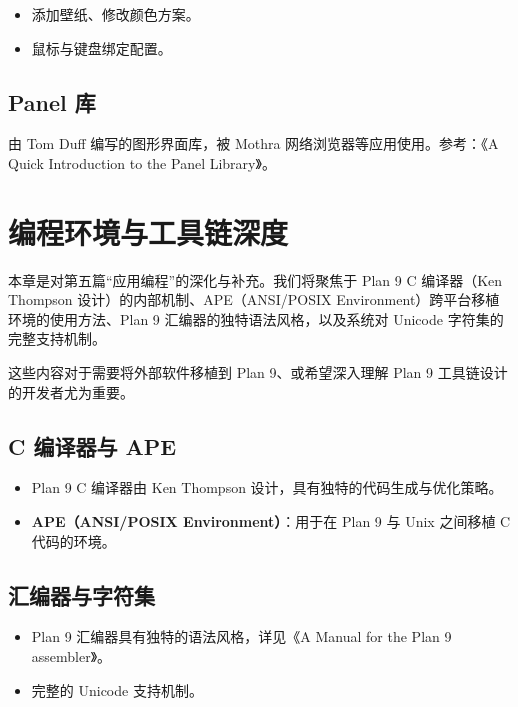 \documentclass[12pt,UTF8]{ctexbook}
\begin{document}
\begin{itemize}
\item 添加壁纸、修改颜色方案。
\item 鼠标与键盘绑定配置。
\end{itemize}

\section{Panel 库}

由 Tom Duff 编写的图形界面库，被 Mothra 网络浏览器等应用使用。参考：《A Quick Introduction to the Panel Library》。

\chapter{编程环境与工具链深度}
	
本章是对第五篇“应用编程”的深化与补充。我们将聚焦于 Plan 9 C 编译器（Ken Thompson 设计）的内部机制、APE（ANSI/POSIX Environment）跨平台移植环境的使用方法、Plan 9 汇编器的独特语法风格，以及系统对 Unicode 字符集的完整支持机制。

这些内容对于需要将外部软件移植到 Plan 9、或希望深入理解 Plan 9 工具链设计的开发者尤为重要。
	
\section{C 编译器与 APE}

\begin{itemize}
\item Plan 9 C 编译器由 Ken Thompson 设计，具有独特的代码生成与优化策略。
\item \textbf{APE（ANSI/POSIX Environment）}：用于在 Plan 9 与 Unix 之间移植 C 代码的环境。
\end{itemize}

\section{汇编器与字符集}
\begin{itemize}
\item Plan 9 汇编器具有独特的语法风格，详见《A Manual for the Plan 9 assembler》。
\item 完整的 Unicode 支持机制。
\end{itemize}
	
\end{document}
